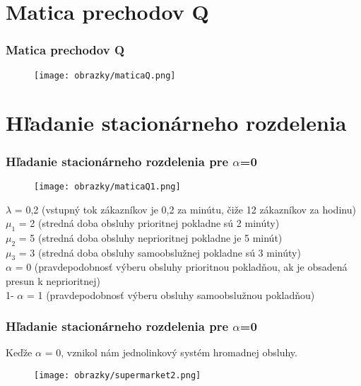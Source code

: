 \documentclass[hyperref={pdfpagelabels=false}]{beamer}
\begin{document}
\section{Matica prechodov Q}
\begin{frame}
\frametitle{Matica prechodov Q}
\begin{figure}[!hlrbt]
\begin{center}
\texttt{[image: obrazky/maticaQ.png]}
\end{center}
\end{figure}
\end{frame}

\section{Hľadanie stacionárneho rozdelenia}
\begin{frame}
\frametitle{Hľadanie stacionárneho rozdelenia pre $\alpha$=0}
\begin{figure}[!hlrbt]
\begin{center}
\texttt{[image: obrazky/maticaQ1.png]}
\end{center}
\end{figure}
$\lambda$ = 0,2  (vstupný tok zákazníkov je 0,2 za minútu, čiže 12 zákazníkov za hodinu)\\
$\mu_1$ = 2 (stredná doba obsluhy prioritnej pokladne sú 2 minúty)\\
$\mu_2$ = 5 (stredná doba obsluhy neprioritnej pokladne je 5 minút)\\
$\mu_3$ = 3 (stredná doba obsluhy samoobslužnej pokladne sú 3 minúty)\\
$\alpha$ = 0 (pravdepodobnosť výberu obsluhy prioritnou pokladňou, ak je obsadená presun k neprioritnej)\\
1- $\alpha$ = 1 (pravdepodobnosť výberu obsluhy samoobslužnou pokladňou)
\end{frame}

\begin{frame}
\frametitle{Hľadanie stacionárneho rozdelenia  pre $\alpha$=0}
Keďže $\alpha$ = 0, vznikol nám jednolinkový systém hromadnej obsluhy.\\

\begin{figure}[!hlrbt]
\begin{center}
\texttt{[image: obrazky/supermarket2.png]}
\end{center}
\end{figure}
\end{frame}
\end{document}
